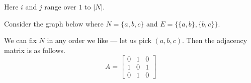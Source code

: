 \documentclass{iansnotes}
\begin{document}
  Here $i$ and $j$ range over $1$ to $|N|$.
  
  Consider the graph below where $N = \{a, b, c\}$ and $E = \{ \{a, b\}, \{b, c\} \}$.
  \begin{center}
  \end{center}
  We can fix $N$ in any order we like --- let us pick $(a,b,c)$.
  Then the adjacency matrix is as follows.
  \[ A = \begin{bmatrix} 0 & 1 & 0 \\ 1 & 0 & 1 \\ 0 & 1 & 0 \end{bmatrix} \]
\end{document}
